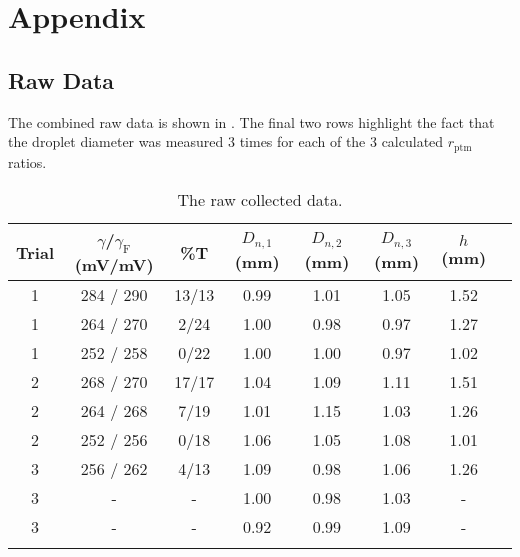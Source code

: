 \chapter*{Appendix}
\setcounter{chapter}{5}
	\setcounter{section}{0}
	\setcounter{table}{0}
\label{app:raw}
\section*{Raw Data}
The combined raw data is shown in . The final two rows highlight the fact that the droplet diameter was measured 3 times for each of the 3 calculated $r_\mathrm{ptm}$ ratios.
\renewcommand{\thetable}{\Alph{table}}
\begin{table}[ht]
\caption{The raw collected data.}
\centering
\begin{tabular}{cccccccc}
  \hline
 Trial & $\gamma$/$\gamma_\mathrm{F}$ (mV/mV) & \%T & $D_{n,1}$ (mm) &$D_{n,2}$ (mm) & $D_{n,3}$ (mm)& $h$ (mm) \\ 
  \hline
 1  & 284 / 290 & 13/13 & 0.99 &1.01&1.05& 1.52  \\ 
   1  & 264 / 270 & 2/24 & 1.00 &0.98 &0.97 & 1.27   \\ 
   1  & 252 / 258 & 0/22 & 1.00 & 1.00 &0.97 & 1.02  \\ 
   2  & 268 / 270 & 17/17 & 1.04 &1.09 &1.11 & 1.51 \\ 
   2  & 264 / 268 & 7/19 & 1.01 &1.15 &1.03 & 1.26   \\ 
   2  & 252 / 256 & 0/18 & 1.06 &1.05 &1.08 & 1.01   \\ 
   3  & 256 / 262 & 4/13 & 1.09& 0.98& 1.06 & 1.26   \\
   3&-&-& 1.00 & 0.98 & 1.03 & -\\
   3&-&-& 0.92& 0.99& 1.09 & -
   \\ 
   \hline
  \label{raw}
\end{tabular}
\end{table}
